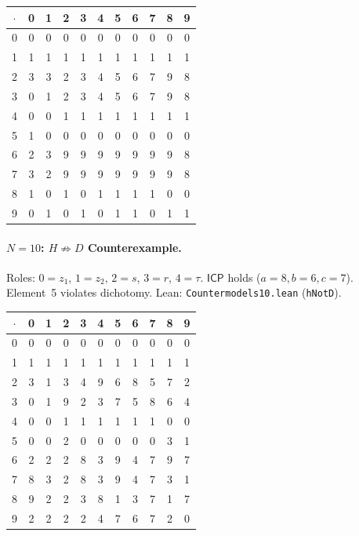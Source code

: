 \documentclass[sigconf,screen,review,anonymous]{acmart}
\newcommand{\dotop}{\cdot}
\newcommand{\ICP}{\textsf{ICP}}
\theoremstyle{remark}
\begin{document}
\medskip
{\footnotesize
\begin{tabular}{c|cccccccccc}
$\dotop$ & 0 & 1 & 2 & 3 & 4 & 5 & 6 & 7 & 8 & 9 \\\hline
0 & 0 & 0 & 0 & 0 & 0 & 0 & 0 & 0 & 0 & 0 \\
1 & 1 & 1 & 1 & 1 & 1 & 1 & 1 & 1 & 1 & 1 \\
2 & 3 & 3 & 2 & 3 & 4 & 5 & 6 & 7 & 9 & 8 \\
3 & 0 & 1 & 2 & 3 & 4 & 5 & 6 & 7 & 9 & 8 \\
4 & 0 & 0 & 1 & 1 & 1 & 1 & 1 & 1 & 1 & 1 \\
5 & 1 & 0 & 0 & 0 & 0 & 0 & 0 & 0 & 0 & 0 \\
6 & 2 & 3 & 9 & 9 & 9 & 9 & 9 & 9 & 9 & 8 \\
7 & 3 & 2 & 9 & 9 & 9 & 9 & 9 & 9 & 9 & 8 \\
8 & 1 & 0 & 1 & 0 & 1 & 1 & 1 & 1 & 0 & 0 \\
9 & 0 & 1 & 0 & 1 & 0 & 1 & 1 & 0 & 1 & 1 \\
\end{tabular}}

\paragraph{$N\!=\!10$: $H \not\Rightarrow D$ Counterexample.}
Roles: $0 = z_1$, $1 = z_2$, $2 = s$, $3 = r$, $4 = \tau$. $\ICP$ holds ($a\!=\!8, b\!=\!6, c\!=\!7$). Element~5 violates dichotomy. \quad Lean: \texttt{Countermodels10.lean} (\texttt{hNotD}).

\medskip
{\footnotesize
\begin{tabular}{c|cccccccccc}
$\dotop$ & 0 & 1 & 2 & 3 & 4 & 5 & 6 & 7 & 8 & 9 \\\hline
0 & 0 & 0 & 0 & 0 & 0 & 0 & 0 & 0 & 0 & 0 \\
1 & 1 & 1 & 1 & 1 & 1 & 1 & 1 & 1 & 1 & 1 \\
2 & 3 & 1 & 3 & 4 & 9 & 6 & 8 & 5 & 7 & 2 \\
3 & 0 & 1 & 9 & 2 & 3 & 7 & 5 & 8 & 6 & 4 \\
4 & 0 & 0 & 1 & 1 & 1 & 1 & 1 & 1 & 0 & 0 \\
5 & 0 & 0 & 2 & 0 & 0 & 0 & 0 & 0 & 3 & 1 \\
6 & 2 & 2 & 2 & 8 & 3 & 9 & 4 & 7 & 9 & 7 \\
7 & 8 & 3 & 2 & 8 & 3 & 9 & 4 & 7 & 3 & 1 \\
8 & 9 & 2 & 2 & 3 & 8 & 1 & 3 & 7 & 1 & 7 \\
9 & 2 & 2 & 2 & 2 & 4 & 7 & 6 & 7 & 2 & 0 \\
\end{tabular}}
\end{document}
